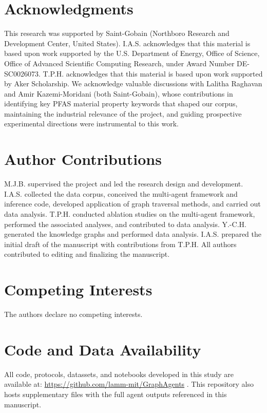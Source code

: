 \section*{Acknowledgments}
\label{sec:acknowledgements} 
This research was supported by Saint-Gobain (Northboro Research and Development Center, United States). 
%
I.A.S. acknowledges that this material is based upon work supported by the U.S. Department of Energy, Office of Science, Office of Advanced Scientific Computing Research, under Award Number DE-SC0026073. T.P.H. acknowledges that this material is based upon work supported by Aker Scholarship.
%
We acknowledge valuable discussions with Lalitha Raghavan and Amir Kazemi-Moridani (both Saint-Gobain), whose contributions in identifying key PFAS material property keywords that shaped our corpus, maintaining the industrial relevance of the project, and guiding prospective experimental directions were instrumental to this work.

\section*{Author Contributions}
\label{sec:contributions}

M.J.B. supervised the project and led the research design and development. I.A.S. collected the data corpus, conceived the multi-agent framework and inference code, developed application of graph traversal methods, and carried out data analysis. T.P.H. conducted ablation studies on the multi-agent framework, performed the associated analyses, and contributed to data analysis. Y.-C.H. generated the knowledge graphs and performed data analysis. I.A.S. prepared the initial draft of the manuscript with contributions from T.P.H. All authors contributed to editing and finalizing the manuscript.

\section*{Competing Interests}
\label{sec:competingInterests}
The authors declare no competing interests.

\section*{Code and Data Availability}
\label{sec:codeAvailability}
All code, protocols, datassets, and notebooks developed in this study are available at: \url{https://github.com/lamm-mit/GraphAgents} . This repository also hosts supplementary files with the full agent outputs referenced in this manuscript.